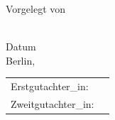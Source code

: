 {\begin{titlepage}
\begin{center}
	{\fontsize{12}{14}\selectfont Vorgelegt von} \\[0.5em]
	{\fontsize{18}{22}\selectfont \@author} \\[1em]
\end{center}

			\vspace{1cm}
	
	\begin{center}
		{\fontsize{12}{14}\selectfont Datum} \\[0.5em]
		{\fontsize{14}{17}\selectfont Berlin, \@submitDate}
	\end{center}
	
	
	\begin{center}
		{\fontsize{18}{22}\selectfont
			\begin{tabular}{@{}>{\raggedleft\arraybackslash}p{5cm} l@{}}
				Erstgutachter\_in: & \@firstExaminer \\
				Zweitgutachter\_in: & \@secondExaminer
			\end{tabular}
		}
	\end{center}
		
		\restoregeometry
	\end{titlepage}
}

\makeatother